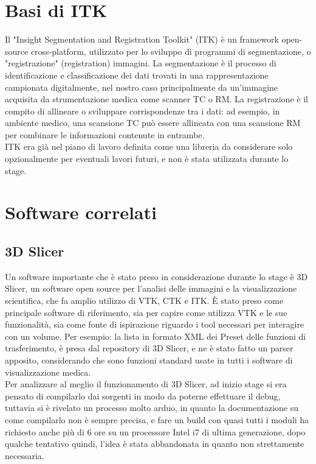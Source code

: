 \section{Basi di ITK}

Il "Insight Segmentation and Registration Toolkit" (ITK) è un framework open-source cross-platform, utilizzato per lo sviluppo di programmi di segmentazione, o "registrazione" (registration) immagini. La segmentazione è il processo di identificazione e classificazione dei dati trovati in una rappresentazione campionata digitalmente, nel nostro caso principalmente da un'immagine acquisita da strumentazione medica come scanner TC o RM. La registrazione è il compito di allineare o sviluppare corrispondenze tra i dati: ad esempio, in ambiente medico, una scansione TC può essere allineata con una scansione RM per combinare le informazioni contenute in entrambe.
\\
ITK era già nel piano di lavoro definita come una libreria da considerare solo opzionalmente per eventuali lavori futuri, e non è stata utilizzata durante lo stage.

\section{Software correlati}
\subsection{3D Slicer}
Un software importante che è stato preso in considerazione durante lo stage è 3D Slicer, un software open source per l'analisi delle immagini e la visualizzazione scientifica, che fa amplio utilizzo di VTK, CTK e ITK. \`E stato preso come principale software di riferimento, sia per capire come utilizza VTK e le sue funzionalità, sia come fonte di ispirazione riguardo i tool necessari per interagire con un volume. Per esempio: la lista in formato XML dei Preset delle funzioni di trasferimento, è presa dal repository di 3D Slicer, e ne è stato fatto un parser apposito, considerando che sono funzioni standard usate in tutti i software di visualizzazione medica.\\
Per analizzare al meglio il funzionamento di 3D Slicer, ad inizio stage si era pensato di compilarlo dai sorgenti in modo da poterne effettuare il debug, tuttavia si è rivelato un processo molto arduo, in quanto la documentazione su come compilarlo non è sempre precisa, e fare un build con quasi tutti i moduli ha richiesto anche più di 6 ore su un processore Intel i7 di ultima generazione, dopo qualche tentativo quindi, l'idea è stata abbandonata in quanto non strettamente necessaria.

